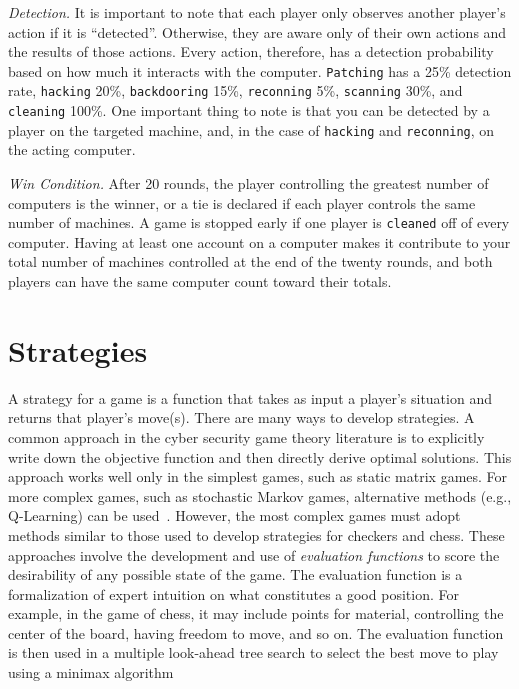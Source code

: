 \documentclass{sig-alternate}
\begin{document}
{\em Detection.}
It is important to note that each player only observes another player's action if it is ``detected''. 
Otherwise, they are aware only of their own actions and the results of those actions. 
Every action, therefore, has a detection probability based on how much it interacts with the computer.  
{\tt Patching} has a 25\% detection rate, {\tt hacking} 20\%, {\tt backdooring} 15\%, {\tt reconning} 5\%, {\tt scanning} 30\%, and {\tt cleaning} 100\%. 
One important thing to note is that you can be detected by a player on the targeted machine, and, in the case of {\tt hacking} and {\tt reconning}, on the acting computer. 


{\em Win Condition.}
After 20 rounds, the player controlling the greatest number of computers is the winner, or a tie is declared if each player controls the same number of machines. 
A game is stopped early if one player is {\tt cleaned} off of every computer. 
Having at least one account on a computer makes it contribute to your total number of machines controlled at the end of the twenty rounds, and both players can have the same computer count toward their totals.  


\section{Strategies}
\label{sec:strategies}

A strategy for a game is a function that takes as input a player's situation and returns that player's move(s).
There are many ways to develop strategies. 
A common approach in the cyber security game theory literature is to explicitly write down the objective function and then directly derive optimal solutions. This approach works well only in the simplest games, such as static matrix games. For more complex games, such as stochastic Markov games, alternative methods (e.g., Q-Learning) can be used~\cite{alpcan2006intrusion}. However, the most complex games must adopt methods similar to those used to develop strategies for checkers and chess. These approaches involve the development and use of {\em evaluation functions} to score the desirability of any possible state of the game. The evaluation function is a formalization of expert intuition on what constitutes a good position. For example, in the game of chess, it may include points for material, controlling the center of the board, having freedom to move, and so on. The evaluation function is then used in a multiple look-ahead tree search to select the best move to play using a minimax algorithm~\cite{shannon1950programming}
\end{document}
